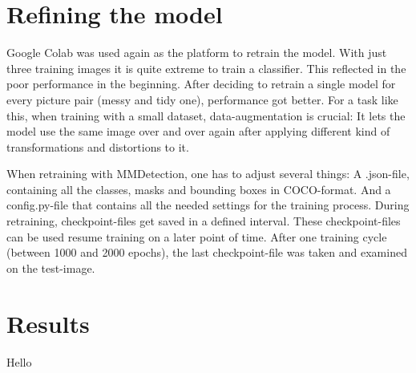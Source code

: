 \section{Refining the model}

Google Colab was used again as the platform to retrain the model. With just three training images it is quite extreme to train a classifier. This reflected in the poor performance in the beginning. After deciding to retrain a single model for every picture pair (messy and tidy one), performance got better. For a task like this, when training with a small dataset, data-augmentation is crucial: It lets the model use the same image over and over again after applying different kind of transformations and distortions to it.

When retraining with MMDetection, one has to adjust several things: A .json-file, containing all the classes, masks and bounding boxes in COCO-format. And a config.py-file that contains all the needed settings for the training process. During retraining, checkpoint-files get saved in a defined interval. These checkpoint-files can be used resume training on a later point of time. After one training cycle (between 1000 and 2000 epochs), the last checkpoint-file was taken and examined on the test-image.

\section{Results}

Hello